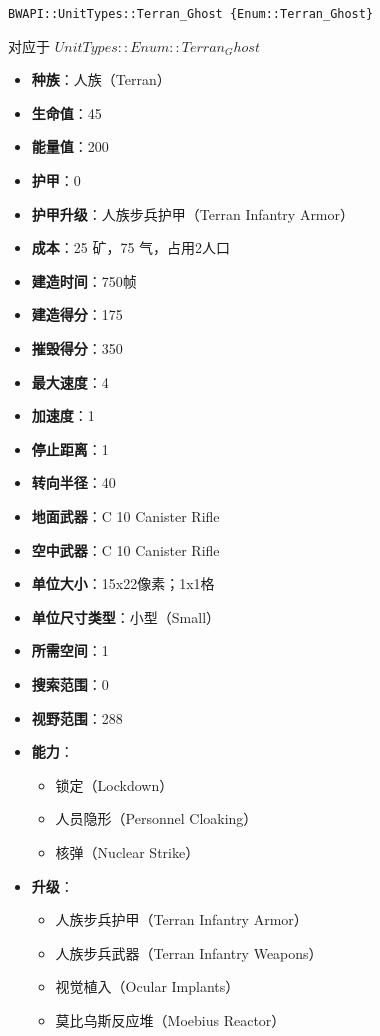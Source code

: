 \begin{tcolorbox}[colback=white, colframe=black!60!white, title=Terran\_Ghost(), arc=0mm]
\begin{verbatim}
BWAPI::UnitTypes::Terran_Ghost {Enum::Terran_Ghost}
\end{verbatim}
对应于  $UnitTypes::Enum::Terran_Ghost$ 
\begin{itemize}
    \item \textbf{种族}：人族（Terran）
    \item \textbf{生命值}：45
    \item \textbf{能量值}：200
    \item \textbf{护甲}：0
    \item \textbf{护甲升级}：人族步兵护甲（Terran Infantry Armor）
    \item \textbf{成本}：25 矿，75 气，占用2人口
    \item \textbf{建造时间}：750帧
    \item \textbf{建造得分}：175
    \item \textbf{摧毁得分}：350
    \item \textbf{最大速度}：4
    \item \textbf{加速度}：1
    \item \textbf{停止距离}：1
    \item \textbf{转向半径}：40
    \item \textbf{地面武器}：C 10 Canister Rifle
    \item \textbf{空中武器}：C 10 Canister Rifle
    \item \textbf{单位大小}：15x22像素；1x1格
    \item \textbf{单位尺寸类型}：小型（Small）
    \item \textbf{所需空间}：1
    \item \textbf{搜索范围}：0
    \item \textbf{视野范围}：288
    \item \textbf{能力}：
        \begin{itemize}
            \item 锁定（Lockdown）
            \item 人员隐形（Personnel Cloaking）
            \item 核弹（Nuclear Strike）
        \end{itemize}
    \item \textbf{升级}：
        \begin{itemize}
            \item 人族步兵护甲（Terran Infantry Armor）
            \item 人族步兵武器（Terran Infantry Weapons）
            \item 视觉植入（Ocular Implants）
            \item 莫比乌斯反应堆（Moebius Reactor）
        \end{itemize}
    \end{itemize}
\end{tcolorbox}
